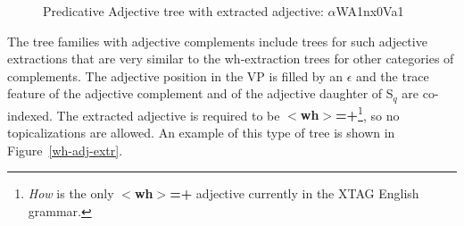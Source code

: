 \begin{figure}[htb]
\centering
\mbox{}
\caption{Predicative Adjective tree with extracted adjective: $\alpha$WA1nx0Va1}
\label{wh-adj-extr} 
\label{1;7,14}
\end{figure}


The tree families with adjective complements include trees for such adjective
extractions that are very similar to the wh-extraction trees for other
categories of complements.  The adjective position in the VP is filled by an
{\it $\epsilon$} and the trace feature of the adjective complement and of the
adjective daughter of S$_{q}$ are co-indexed.  The extracted adjective is
required to be {\bf $<$wh$>$=+}\footnote{{\it How} is the only {\bf
$<$wh$>$=+} adjective currently in the XTAG English grammar.}, so no
topicalizations are allowed.  An example of this type of tree is shown in
Figure~\ref{wh-adj-extr}.









